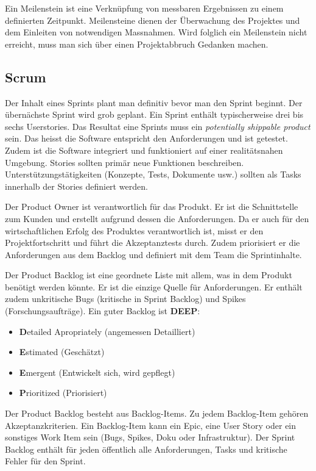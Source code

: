 Ein Meilenstein ist eine Verknüpfung von messbaren Ergebnissen zu einem definierten Zeitpunkt. Meilensteine dienen der Überwachung des Projektes und dem Einleiten von notwendigen Massnahmen. Wird folglich ein Meilenstein nicht erreicht, muss man sich über einen Projektabbruch Gedanken machen.

\subsection{Scrum}

Der Inhalt eines Sprints plant man definitiv bevor man den Sprint beginnt. Der übernächste Sprint wird grob geplant. Ein Sprint enthält typischerweise drei bis sechs Userstories. Das Resultat eine Sprints muss ein \emph{potentially shippable product} sein. Das heisst die Software entspricht den Anforderungen und ist getestet. Zudem ist die Software integriert und funktioniert auf einer realitätsnahen Umgebung. Stories sollten primär neue Funktionen beschreiben. Unterstützungstätigkeiten (Konzepte, Tests, Dokumente usw.) sollten als Tasks innerhalb der Stories definiert werden.

Der Product Owner ist verantwortlich für das Produkt. Er ist die Schnittstelle zum Kunden und erstellt aufgrund dessen die Anforderungen. Da er auch für den wirtschaftlichen Erfolg des Produktes verantwortlich ist, misst er den Projektfortschritt und führt die Akzeptanztests durch. Zudem priorisiert er die Anforderungen aus dem Backlog und definiert mit dem Team die Sprintinhalte.

Der Product Backlog ist eine geordnete Liste mit allem, was in dem Produkt benötigt werden könnte. Er ist die einzige Quelle für Anforderungen. Er enthält zudem unkritische Bugs (kritische in Sprint Backlog) und Spikes (Forschungsaufträge). Ein guter Backlog ist \textbf{DEEP}:
\begin{itemize}
	\item \textbf{D}etailed Apropriately (angemessen Detailliert)
	\item \textbf{E}stimated (Geschätzt)
	\item \textbf{E}mergent (Entwickelt sich, wird gepflegt)
	\item \textbf{P}rioritized (Priorisiert)
\end{itemize}
Der Product Backlog besteht aus Backlog-Items. Zu jedem Backlog-Item gehören Akzeptanzkriterien. Ein Backlog-Item kann ein Epic, eine User Story oder ein sonstiges Work Item sein (Bugs, Spikes, Doku oder Infrastruktur). Der Sprint Backlog enthält für jeden öffentlich alle Anforderungen, Tasks und kritische Fehler für den Sprint.

